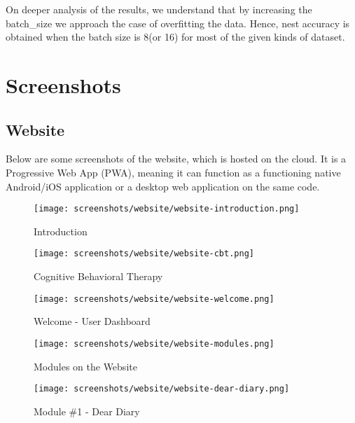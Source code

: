 On deeper analysis of the results, we understand that by increasing the batch\_size we approach the case of overfitting the data. Hence, nest accuracy is obtained when the batch size is 8(or 16) for most of the given kinds of dataset.

\pagebreak

\section{Screenshots}

\subsection{Website}

\noindent
Below are some screenshots of the website, which is hosted on the cloud. It is a Progressive Web App (PWA), meaning it can function as a functioning native Android/iOS application or a desktop web application on the same code.

\vspace*{\fill}
\begin{figure}[H]
    \centering
    \texttt{[image: screenshots/website/website-introduction.png]}
    \caption{Introduction}
\end{figure}
\vspace*{\fill}

\pagebreak

\vspace*{\fill}
\begin{figure}[H]
    \centering
    \texttt{[image: screenshots/website/website-cbt.png]}
    \caption{Cognitive Behavioral Therapy}
\end{figure}

\begin{figure}[H]
    \centering
    \texttt{[image: screenshots/website/website-welcome.png]}
    \caption{Welcome - User Dashboard}
\end{figure}
\vspace*{\fill}

\pagebreak

\vspace*{\fill}
\begin{figure}[H]
    \centering
    \texttt{[image: screenshots/website/website-modules.png]}
    \caption{Modules on the Website}
\end{figure}

\begin{figure}[H]
    \centering
    \texttt{[image: screenshots/website/website-dear-diary.png]}
    \caption{Module \#1 - Dear Diary}
\end{figure}
\vspace*{\fill}

